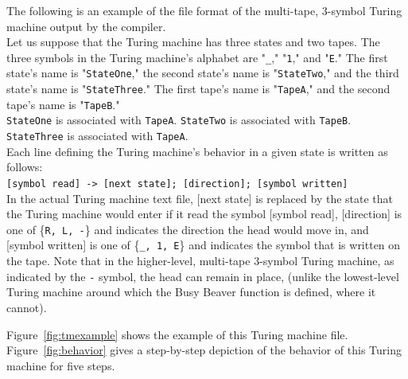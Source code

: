 \documentclass{report}
\begin{document}
The following is an example of the file format of the multi-tape, 3-symbol Turing machine output by the compiler. \\

Let us suppose that the Turing machine has three states and two tapes. The three symbols in the Turing machine's alphabet are "\texttt{\_}," "\texttt{1}," and "\texttt{E}." The first state's name is "\texttt{StateOne}," the second state's name is "\texttt{StateTwo}," and the third state's name is "\texttt{StateThree}." The first tape's name is "\texttt{TapeA}," and the second tape's name is "\texttt{TapeB}." \\

\texttt{StateOne} is associated with \texttt{TapeA}. \texttt{StateTwo} is associated with \texttt{TapeB}. \texttt{StateThree} is associated with \texttt{TapeA}. \\

Each line defining the Turing machine's behavior in a given state is written as follows: \\

\texttt{[symbol read] -> [next state]; [direction]; [symbol written]} \\

In the actual Turing machine text file, [next state] is replaced by the state that the Turing machine would enter if it read the symbol [symbol read], [direction] is one of \{\texttt{R, L, -}\} and indicates the direction the head would move in, and [symbol written] is one of \{\texttt{\_, 1, E}\} and indicates the symbol that is written on the tape. Note that in the higher-level, multi-tape 3-symbol Turing machine, as indicated by the \texttt{-} symbol, the head can remain in place, (unlike the lowest-level Turing machine around which the Busy Beaver function is defined, where it cannot). 

Figure~\ref{fig:tmexample} shows the example of this Turing machine file. Figure~\ref{fig:behavior} gives a step-by-step depiction of the behavior of this Turing machine for five steps. \\
\end{document}
